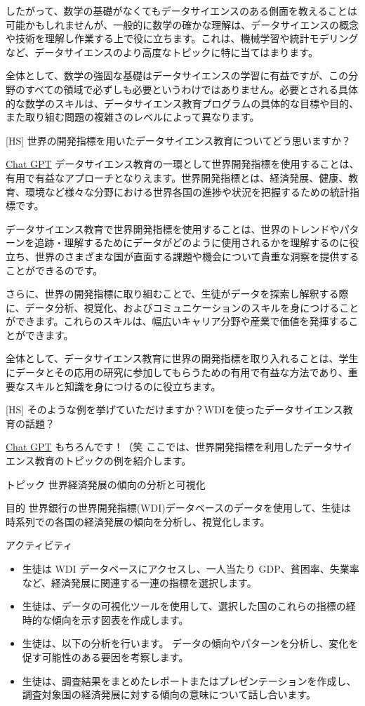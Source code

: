 \documentclass[
]{book}
\providecommand{\tightlist}{%
  \setlength{\itemsep}{0pt}\setlength{\parskip}{0pt}}
\theoremstyle{definition}
\theoremstyle{definition}
\theoremstyle{definition}
\theoremstyle{definition}
\theoremstyle{remark}
\begin{document}
したがって、数学の基礎がなくてもデータサイエンスのある側面を教えることは可能かもしれませんが、一般的に数学の確かな理解は、データサイエンスの概念や技術を理解し作業する上で役に立ちます。これは、機械学習や統計モデリングなど、データサイエンスのより高度なトピックに特に当てはまります。

全体として、数学の強固な基礎はデータサイエンスの学習に有益ですが、この分野のすべての領域で必ずしも必要というわけではありません。必要とされる具体的な数学のスキルは、データサイエンス教育プログラムの具体的な目標や目的、また取り組む問題の複雑さのレベルによって異なります。

{[}HS{]} 世界の開発指標を用いたデータサイエンス教育についてどう思いますか？

\protect\hyperlink{chatgpt}{Chat GPT} データサイエンス教育の一環として世界開発指標を使用することは、有用で有益なアプローチとなりえます。世界開発指標とは、経済発展、健康、教育、環境など様々な分野における世界各国の進捗や状況を把握するための統計指標です。

データサイエンス教育で世界開発指標を使用することは、世界のトレンドやパターンを追跡・理解するためにデータがどのように使用されるかを理解するのに役立ち、世界のさまざまな国が直面する課題や機会について貴重な洞察を提供することができるのです。

さらに、世界の開発指標に取り組むことで、生徒がデータを探索し解釈する際に、データ分析、視覚化、およびコミュニケーションのスキルを身につけることができます。これらのスキルは、幅広いキャリア分野や産業で価値を発揮することができます。

全体として、データサイエンス教育に世界の開発指標を取り入れることは、学生にデータとその応用の研究に参加してもらうための有用で有益な方法であり、重要なスキルと知識を身につけるのに役立ちます。

{[}HS{]} そのような例を挙げていただけますか？WDIを使ったデータサイエンス教育の話題？

\protect\hyperlink{chatgpt}{Chat GPT} もちろんです！（笑 ここでは、世界開発指標を利用したデータサイエンス教育のトピックの例を紹介します。

トピック 世界経済発展の傾向の分析と可視化

目的 世界銀行の世界開発指標(WDI)データベースのデータを使用して、生徒は時系列での各国の経済発展の傾向を分析し、視覚化します。

アクティビティ

\begin{itemize}
\tightlist
\item
  生徒は WDI データベースにアクセスし、一人当たり GDP、貧困率、失業率など、経済発展に関連する一連の指標を選択します。
\item
  生徒は、データの可視化ツールを使用して、選択した国のこれらの指標の経時的な傾向を示す図表を作成します。
\item
  生徒は、以下の分析を行います。 データの傾向やパターンを分析し、変化を促す可能性のある要因を考察します。
\item
  生徒は、調査結果をまとめたレポートまたはプレゼンテーションを作成し、調査対象国の経済発展に対する傾向の意味について話し合います。
\end{itemize}
\end{document}
